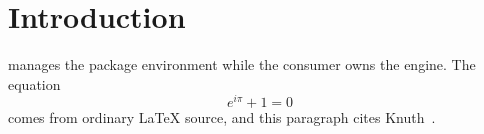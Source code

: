 \section{Introduction}

\pqtyname{} manages the package environment while the consumer owns the
engine. The equation
\[
  e^{i\pi} + 1 = 0
\]
comes from ordinary \LaTeX{} source, and this paragraph cites
Knuth~\cite{knuth1984}.
